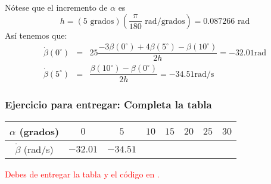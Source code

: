 \begin{frame}
Nótese que el incremento de $\alpha$ es
\[h = (5 \text{ grados}) \left( \frac{\pi}{180} \text{ rad} / \text{grados} \right) = 0.087266 \text{ rad}\]
Así tenemos que:
\begin{eqnarray*}
\dot{\beta}(0^{\circ}) &=&  25 \dfrac{-3 \beta(0^{\circ})+ 4 \beta(5^{\circ})-\beta(10^{\circ})}{2h} = -32.01 \text{rad} \\
\dot{\beta}(5^{\circ}) &=& \dfrac{\beta(10^{\circ})- \beta(0^{\circ})}{2h} = -34.51 \text{rad/s}
\end{eqnarray*}
\end{frame}
\begin{frame}
\frametitle{Ejercicio para entregar: Completa la tabla}
\begin{center}
\fontsize{12}{12}\selectfont
\begin{tabular}{c | c | c | c | c | c | c | c}
$\alpha$ (grados) & $0$ & $5$ & $10$ & $15$ & $20$ & $25$ & $30$  \\ \hline
$\dot{\beta}$ (rad/s) & $-32.01$ & $-34.51$ &  &  &  &  & 
\end{tabular}
\end{center}
\textcolor{red}{Debes de entregar la tabla y el código en \python.}
\end{frame}
%
